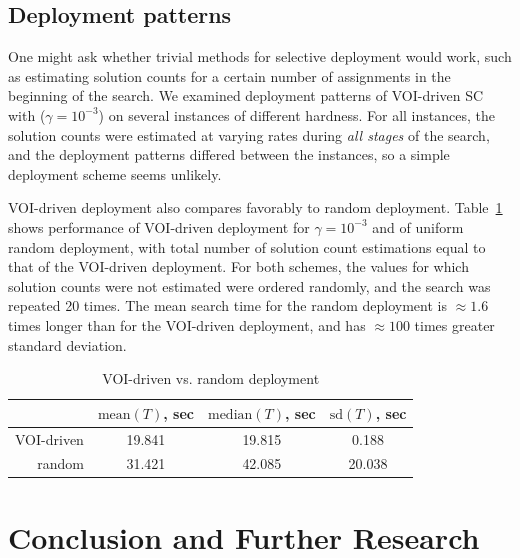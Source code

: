 \subsection{Deployment patterns}

One might ask whether trivial methods for selective deployment would
work, such as estimating solution counts for a certain number of
assignments in the beginning of the search. We examined deployment
patterns of VOI-driven SC with ($\gamma=10^{-3}$) on several instances
of different hardness. For all instances, the solution counts were
estimated at varying rates during \emph{all stages} of the search, and
the deployment patterns differed between the instances, so a simple
deployment scheme seems unlikely.

VOI-driven deployment also compares favorably to
random deployment. Table~\ref{tbl:voirnd} shows
performance of VOI-driven deployment for $\gamma=10^{-3}$ and of
uniform random deployment, with total number of solution count estimations
equal to that of the VOI-driven deployment.
For both schemes, the values for which solution
counts were not estimated were ordered randomly, and the search
was repeated 20 times.  The mean search time for the random deployment is
$\approx1.6$ times longer than for the VOI-driven deployment, and has
$\approx100$ times greater standard deviation.
\begin{table}[h]
\begin{center}
\small
\begin{tabular}{r|c|c|c}
               & $\mathrm{mean}(T)$, sec & $\mathrm{median}(T)$, sec & $\mathrm{sd}(T)$, sec \\ \hline
VOI-driven     & 19.841                  & 19.815                    & 0.188 \\ \hline
random         & 31.421                  & 42.085                    & 20.038  
\end{tabular}
\end{center}
\caption{VOI-driven vs. random deployment}
\label{tbl:voirnd}
\end{table}

\section{Conclusion and Further Research}
\label{sec:csp-summary}

